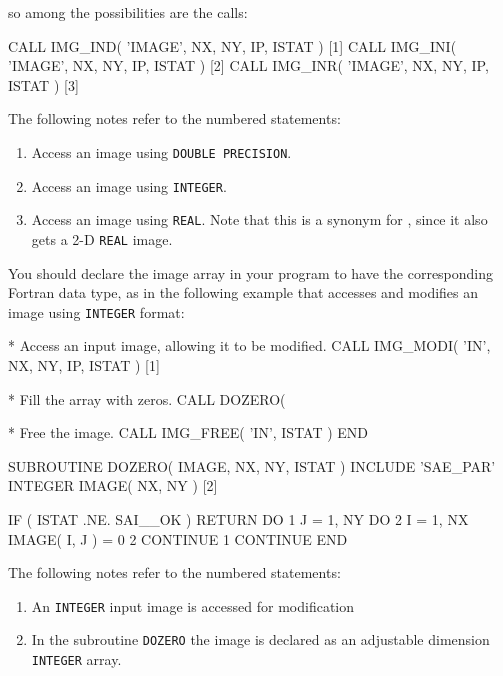 \documentclass[twoside,11pt,nolof]{starlink}
\providecommand{\myverb}[1]{{\texttt{#1}}}
\providecommand{\mynote}{The following notes refer to the numbered statements:}
\newenvironment{code}{\begin{small}}
                     {\end{small}}
\newenvironment{enumnotes}
{
   \renewcommand{\labelenumi}{\myverb{[\theenumi]}}
   \begin{enumerate}
}{
   \end{enumerate}
   \renewcommand{\labelenumi}{\theenumi}
}
\begin{document}
so among the possibilities are the calls:
\begin{code}
\begin{terminalv}
      CALL IMG_IND( 'IMAGE', NX, NY, IP, ISTAT )              [1]
      CALL IMG_INI( 'IMAGE', NX, NY, IP, ISTAT )              [2]
      CALL IMG_INR( 'IMAGE', NX, NY, IP, ISTAT )              [3]
\end{terminalv}
\end{code}
\mynote
\begin{enumnotes}
\item Access an image using \myverb{DOUBLE PRECISION}.

\item Access an image using \myverb{INTEGER}.

\item Access an image using \myverb{REAL}. Note that
this is a synonym for \htmlref{\myverb{IMG\_IN}}{IMG_IN[n][x]}, since it also gets a 2-D
\myverb{REAL} image.
\end{enumnotes}

You should declare the image array in your program to have the
corresponding Fortran data type, as in the following example that
accesses and modifies an image using \myverb{INTEGER} format:
\begin{code}
\begin{terminalv}

*  Access an input image, allowing it to be modified.
      CALL IMG_MODI( 'IN', NX, NY, IP, ISTAT )                [1]

*  Fill the array with zeros.
      CALL DOZERO( %

*  Free the image.
      CALL IMG_FREE( 'IN', ISTAT )
      END

      SUBROUTINE DOZERO( IMAGE, NX, NY, ISTAT )
      INCLUDE 'SAE_PAR'
      INTEGER IMAGE( NX, NY )                                 [2]

      IF ( ISTAT .NE. SAI__OK ) RETURN
      DO 1 J = 1, NY
         DO 2 I = 1, NX
            IMAGE( I, J ) = 0
 2       CONTINUE
 1    CONTINUE
      END
\end{terminalv}
\end{code}
\mynote
\begin{enumnotes}
\item An \myverb{INTEGER} input image is accessed for modification

\item In the subroutine \myverb{DOZERO} the image is declared as an
adjustable dimension \myverb{INTEGER} array.
\end{enumnotes}
\end{document}
